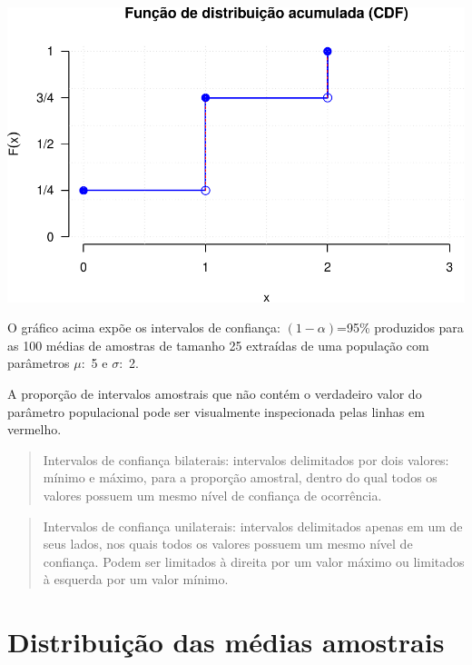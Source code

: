\documentclass[
]{book}
\begin{document}
\includegraphics{apostila_files/figure-latex/unnamed-chunk-104-1.pdf}

\hfill\break

O gráfico acima expõe os intervalos de confiança: \((1-\alpha)\)=95\% produzidos para as 100 médias de amostras de tamanho 25 extraídas de uma população com parâmetros \(\mu:\) 5 e \(\sigma:\) 2.

\hfill\break

A proporção de intervalos amostrais que não contém o verdadeiro valor do parâmetro populacional pode ser visualmente inspecionada pelas linhas em vermelho.

\hfill\break

\begin{quote}
Intervalos de confiança bilaterais: intervalos delimitados por dois valores: mínimo e máximo, para a proporção amostral, dentro do qual todos os valores possuem um mesmo nível de confiança de ocorrência.
\end{quote}

\begin{quote}
Intervalos de confiança unilaterais: intervalos delimitados apenas em um de seus lados, nos quais todos os valores possuem um mesmo nível de confiança. Podem ser limitados à direita por um valor máximo ou limitados à esquerda por um valor mínimo.
\end{quote}

\hypertarget{distribuiuxe7uxe3o-das-muxe9dias-amostrais}{%
\section{Distribuição das médias amostrais}\label{distribuiuxe7uxe3o-das-muxe9dias-amostrais}}
\end{document}
